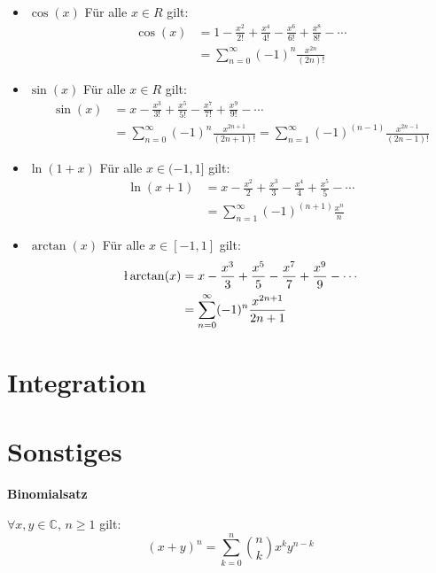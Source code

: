 \documentclass[25pt]{sciposter}
\newenvironment{method}[1]{\begin{mdframed}[backgroundcolor=blue!10,innertopmargin=15pt, innerbottommargin=15pt, nobreak=true]
		\textbf{#1 }
	}
	{ 
	\end{mdframed}
}
\begin{document}
\begin{multicols}{3}
\begin{itemize}
	\item $\boxed{\cos(x)}$ Für alle $x\in R$ gilt:
	\begin{align*}
	\cos(x) &= 1 - \frac{x^2}{2!} + \frac{x^4}{4!} - \frac{x^6}{6!} + \frac{x^8}{8!} - \cdots  \\
	&= \sum_{n=0}^{\infty} (-1)^n \frac{x^{2n}}{(2n)!}
	\end{align*}
	
	\item $\boxed{\sin(x)}$ Für alle $x\in R$ gilt:
	\begin{align*}
	\sin(x) &=  x - \frac{x^3}{3!} + \frac{x^5}{5!} - \frac{x^7}{7!} + \frac{x^9}{9!} - \cdots\\
	&= \sum_{n=0}^{\infty} (-1)^n \frac{x^{2n+1}}{(2n+1)!} = \sum_{n=1}^{\infty} (-1)^{(n-1)} \frac{x^{2n-1}}{(2n-1)!}
	\end{align*}

	\item $\boxed{\ln(1+x)}$ Für alle $x\in (-1,1]$ gilt:
	\begin{align*}
	\ln(x+1) &= x - \frac{x^2}{2} + \frac{x^3}{3} - \frac{x^4}{4} + \frac{x^5}{5}- \cdots \\
	&= \sum_{n=1}^{\infty} (-1)^{(n+1)} \frac{x^n}{n}
	\end{align*}

	\item $\boxed{\arctan(x)}$ Für alle $x\in [-1,1]$ gilt:
	\begin{align*}
	\l\arctan(x) &= x - \frac{x^3}{3} + \frac{x^5}{5} - \frac{x^7}{7} + \frac{x^9}{9} - \cdots \\
	&= \sum_{n=0}^{\infty} (-1)^n \frac{x^{2n+1}}{2n+1}
	\end{align*}

	
\end{itemize}









\section{Integration}











\section{Sonstiges}
\begin{method}{Binomialsatz}
	$\forall x,y \in \mathbb{C}$, $n \geq 1$ gilt:
	$$(x+y)^n = \sum_{k=0}^{n} \binom{n}{k}x^k y^{n-k}$$
\end{method}


\newpage

\end{multicols}
\end{document}
